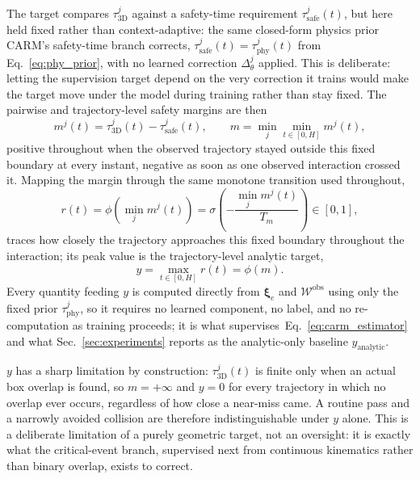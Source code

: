 \documentclass[letterpaper, 10 pt, conference]{ieeeconf}  %
\begin{document}
The target compares $\tau_{\mathrm{3D}}^{j}$ against a safety-time
requirement $\tau_{\mathrm{safe}}^{j}(t)$, but here held fixed rather than
context-adaptive: the same closed-form physics prior CARM's safety-time
branch corrects, $\tau_{\mathrm{safe}}^{j}(t)=\tau_{\mathrm{phy}}^{j}(t)$
from Eq.~\eqref{eq:phy_prior}, with no learned correction $\Delta_\theta^j$
applied. This is deliberate: letting the supervision target depend on the
very correction it trains would make the target move under the model
during training rather than stay fixed. The pairwise and trajectory-level
safety margins are then
\begin{equation}
m^{j}(t)
=
\tau_{\mathrm{3D}}^{j}(t)-\tau_{\mathrm{safe}}^{j}(t),
\qquad
m
=
\min_{j}\min_{t\in[0,H]} m^{j}(t),
\label{eq:future_safety_margin}
\end{equation}
positive throughout when the observed trajectory stayed outside this
fixed boundary at every instant, negative as soon as one observed
interaction crossed it. Mapping the margin through the same monotone
transition used throughout,
\begin{equation}
r(t)
=
\phi\!\left(\min_j m^j(t)\right)
=
\sigma\!\left(-\frac{\min_j m^j(t)}{T_m}\right)
\in[0,1],
\label{eq:continuous_risk}
\end{equation}
traces how closely the trajectory approaches this fixed boundary
throughout the interaction; its peak value is the trajectory-level
analytic target,
\begin{equation}
y
=
\max_{t\in[0,H]} r(t)
=
\phi(m).
\label{eq:analytic_risk_target}
\end{equation}
Every quantity feeding $y$ is computed directly from $\bm{\xi}_e$ and
$\mathcal{W}^{\mathrm{obs}}$ using only the fixed prior
$\tau_{\mathrm{phy}}^{j}$, so it requires no learned component, no label,
and no re-computation as training proceeds; it is what
supervises~Eq.~\eqref{eq:carm_estimator} and what
Sec.~\ref{sec:experiments} reports as the analytic-only baseline
$y_{\mathrm{analytic}}$.

$y$ has a sharp limitation by construction: $\tau_{\mathrm{3D}}^j(t)$ is
finite only when an actual box overlap is found, so $m=+\infty$ and
$y=0$ for every trajectory in which no overlap ever occurs, regardless of
how close a near-miss came. A routine pass and a narrowly avoided
collision are therefore indistinguishable under $y$ alone. This is a
deliberate limitation of a purely geometric target, not an oversight: it
is exactly what the critical-event branch, supervised next from
continuous kinematics rather than binary overlap, exists to correct.
\end{document}
